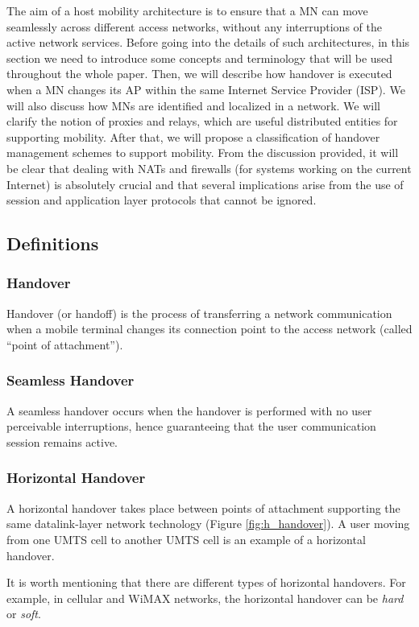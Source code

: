 \documentclass[preprint,12pt]{elsarticle}
\begin{document}
The aim of a host mobility architecture is to ensure that a MN can move seamlessly across 
different access networks, without any interruptions of the active network services. Before going 
into the details of such architectures, in this section we need to introduce some concepts and terminology that will be used throughout the whole paper. Then, we will describe how handover is executed when a MN changes its AP within the same Internet Service Provider (ISP). We will also discuss how MNs are identified and localized in a network. We will clarify the notion of proxies and relays, which are useful distributed entities for supporting mobility. After that, we will propose a classification of handover management schemes to support mobility. From the discussion provided, it will be clear that dealing with NATs and firewalls (for systems working on the current Internet) is absolutely crucial and that several implications arise from the use of session and application layer protocols that cannot be ignored.

\subsection{Definitions}

\subsubsection*{Handover}
Handover (or handoff) is the process of transferring a network communication 
when a mobile terminal changes its connection point to the access network 
(called ``point of attachment''). 
\subsubsection*{Seamless Handover}
A seamless handover occurs when the handover is performed with no user 
perceivable interruptions, hence guaranteeing that the user communication 
session remains active. 
\subsubsection*{Horizontal Handover}
A horizontal handover takes place between points of attachment supporting the 
same datalink-layer network technology (Figure \ref{fig:h_handover}). A user 
moving from one UMTS cell to another UMTS cell is an example of a horizontal 
handover.

It is worth mentioning that there are different types of horizontal handovers. 
For example, in cellular and WiMAX networks, the horizontal handover can be 
\emph{hard} or \emph{soft}.
\end{document}
